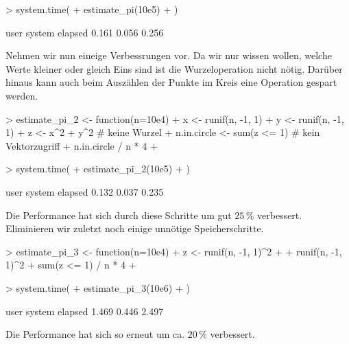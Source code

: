 \begin{Schunk}
\begin{Sinput}
> system.time({
+   estimate_pi(10e5)
+ })   
\end{Sinput}
\begin{Soutput}
   user  system elapsed 
  0.161   0.056   0.256 
\end{Soutput}
\end{Schunk}

Nehmen wir nun eineige Verbessrungen vor. Da wir nur wissen wollen, welche Werte kleiner oder gleich Eins sind ist die Wurzeloperation nicht nötig. Darüber hinaus kann auch beim Auszählen der Punkte im Kreis eine Operation gespart werden.

\begin{Schunk}
\begin{Sinput}
> estimate_pi_2 <- function(n=10e4){
+   x <- runif(n, -1, 1)
+   y <- runif(n, -1, 1) 
+   z <- x^2 + y^2                    # keine Wurzel
+   n.in.circle <- sum(z <= 1)        # kein Vektorzugriff 
+   n.in.circle / n * 4  
+ } 
\end{Sinput}
\end{Schunk}

\begin{Schunk}
\begin{Sinput}
> system.time({
+   estimate_pi_2(10e5)
+ })   
\end{Sinput}
\begin{Soutput}
   user  system elapsed 
  0.132   0.037   0.235 
\end{Soutput}
\end{Schunk}

Die Performance hat sich durch diese Schritte um gut $25\,\%$ verbessert. Eliminieren wir zuletzt noch einige unnötige Speicherschritte.

\begin{Schunk}
\begin{Sinput}
> estimate_pi_3 <- function(n=10e4){ 
+   z <- runif(n, -1, 1)^2 + 
+        runif(n, -1, 1)^2
+   sum(z <= 1) / n * 4 
+ } 
\end{Sinput}
\end{Schunk}

\begin{Schunk}
\begin{Sinput}
> system.time({
+   estimate_pi_3(10e6)
+ })   
\end{Sinput}
\begin{Soutput}
   user  system elapsed 
  1.469   0.446   2.497 
\end{Soutput}
\end{Schunk}

Die Performance hat sich so erneut um ca. $20\,\%$ verbessert. 

